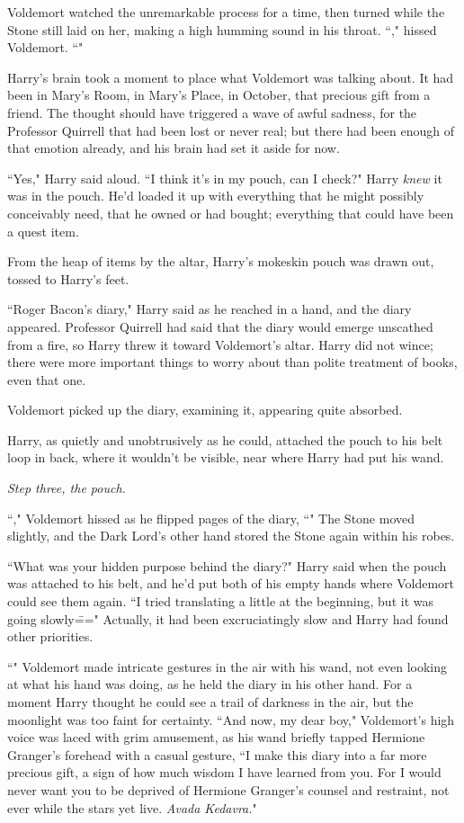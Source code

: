 Voldemort watched the unremarkable process for a time, then turned while the Stone still laid on her, making a high humming sound in his throat. ``," hissed Voldemort. ``"

Harry's brain took a moment to place what Voldemort was talking about. It had been in Mary's Room, in Mary's Place, in October, that precious gift from a friend. The thought should have triggered a wave of awful sadness, for the Professor Quirrell that had been lost or never real; but there had been enough of that emotion already, and his brain had set it aside for now.

``Yes," Harry said aloud. ``I think it's in my pouch, can I check?" Harry \emph{knew} it was in the pouch. He'd loaded it up with everything that he might possibly conceivably need, that he owned or had bought; everything that could have been a quest item.

From the heap of items by the altar, Harry's mokeskin pouch was drawn out, tossed to Harry's feet.

``Roger Bacon's diary," Harry said as he reached in a hand, and the diary appeared. Professor Quirrell had said that the diary would emerge unscathed from a fire, so Harry threw it toward Voldemort's altar. Harry did not wince; there were more important things to worry about than polite treatment of books, even that one.

Voldemort picked up the diary, examining it, appearing quite absorbed.

Harry, as quietly and unobtrusively as he could, attached the pouch to his belt loop in back, where it wouldn't be visible, near where Harry had put his wand.

\emph{Step three, the pouch.}

``," Voldemort hissed as he flipped pages of the diary, ``" The Stone moved slightly, and the Dark Lord's other hand stored the Stone again within his robes.

``What was your hidden purpose behind the diary?" Harry said when the pouch was attached to his belt, and he'd put both of his empty hands where Voldemort could see them again. ``I tried translating a little at the beginning, but it was going slowly\===" Actually, it had been excruciatingly slow and Harry had found other priorities.

``" Voldemort made intricate gestures in the air with his wand, not even looking at what his hand was doing, as he held the diary in his other hand. For a moment Harry thought he could see a trail of darkness in the air, but the moonlight was too faint for certainty. ``And now, my dear boy," Voldemort's high voice was laced with grim amusement, as his wand briefly tapped Hermione Granger's forehead with a casual gesture, ``I make this diary into a far more precious gift, a sign of how much wisdom I have learned from you. For I would never want you to be deprived of Hermione Granger's counsel and restraint, not ever while the stars yet live. \emph{Avada Kedavra.}"

